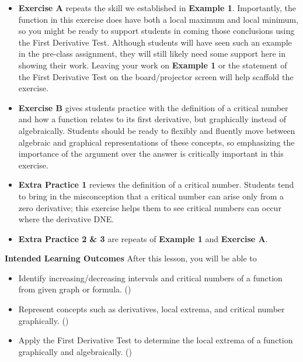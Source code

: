 \documentclass[10pt]{article}
\begin{document}
\begin{itemize}
\begin{itemize}
    \item In part (c), we need to model how students should write their answers. Stating the conclusion by directly invoking the statement of the First Derivative Test helps model how conclusions in mathematics are directly connected to established facts, so you might say something like ``$g'$ does not change signs at the critical number $x=1$, so $g$ has neither a local maximum nor local minimum there by the First Derivative Test."
    \end{itemize} 
\item {\bf\color{blue} Exercise A} repeats the skill we established in {\bf\color{blue}Example 1}. Importantly, the function in this exercise does have both a local maximum and local minimum, so you might be ready to support students in coming those conclusions using the First Derivative Test. Although students will have seen such an example in the pre-class assignment, they will still likely need some support here in showing their work. Leaving your work on {\bf\color{blue}Example 1} or the statement of the First Derivative Test on the board/projector screen will help scaffold the exercise.
\item {\bf\color{blue} Exercise B} gives students practice with the definition of a critical number and how a function relates to its first derivative, but graphically instead of algebraically. Students should be ready to flexibly and fluently move between algebraic and graphical representations of these concepts, so emphasizing the importance of the argument over the answer is critically important in this exercise.
\item {\bf\color{blue} Extra Practice 1} reviews the definition of a critical number. Students tend to bring in the misconception that a critical number can arise only from a zero derivative; this exercise helps them to see critical numbers can occur where the derivative DNE.
\item {\bf\color{blue} Extra Practice 2 \& 3} are repeats of {\bf\color{blue}Example 1} and {\bf\color{blue}Exercise A}.
\end{itemize}

\newpage 
\textbf{Intended Learning Outcomes}
After this lesson, you will be able to 

\begin{itemize}
    \item Identify increasing/decreasing intervals and critical numbers of a function from given graph or formula. ()
    \item Represent concepts such as derivatives, local extrema, and critical number graphically. ()
    \item Apply the First Derivative Test to determine the local extrema of a function graphically and algebraically. ()
\end{itemize}
\end{document}
